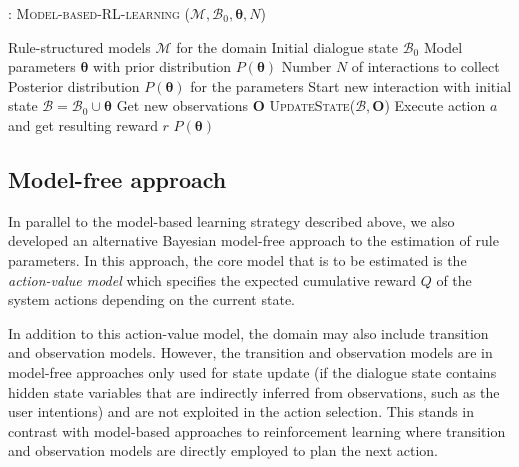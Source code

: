 \begin{algorithm}[h]
\caption{: \textsc{Model-based-RL-learning} ($\mathcal{M}, \mathcal{B}_0, \boldsymbol\theta, N$)}
\begin{algorithmic}[1]\vspace{1mm}
\REQUIRE Rule-structured models $\mathcal{M}$ for the domain
\REQUIRE Initial dialogue state $\mathcal{B}_0$
\REQUIRE Model parameters $\boldsymbol\theta$ with prior distribution $P(\boldsymbol\theta)$
\REQUIRE Number $N$ of interactions to collect
\ENSURE Posterior distribution $P(\boldsymbol\theta)$ for the parameters  \vspace{1mm}
\STATE Start new interaction with initial state $\mathcal{B} = \mathcal{B}_0 \cup \boldsymbol\theta $
\STATE Get new observations $\mathbf{O}$
\STATE \textsc{UpdateState}($\mathcal{B}, \mathbf{O}$)
\STATE Execute action $a$ and get resulting reward $r$
\ENDIF
\ENDWHILE
\ENDFOR
\RETURN $P(\boldsymbol\theta)$
\end{algorithmic} 
\label{algo:rlearning_mb}
\end{algorithm}



\subsection{Model-free approach}
\label{sec:modelfree}

In parallel to the model-based learning strategy described above, we also developed an alternative Bayesian model-free approach to the estimation of rule parameters.  In this approach, the core model that is to be estimated is the \textit{action-value model} which specifies the expected cumulative reward $Q$ of the system actions depending on the current state. 

In addition to this action-value model, the domain may also include transition and observation models. However, the transition and observation models are in model-free approaches only used for state update (if the dialogue state contains hidden state variables that are indirectly inferred from observations, such as the user intentions) and are not exploited in the action selection.  This stands in contrast with model-based approaches to reinforcement learning where transition and observation  models are directly employed to plan the next action.

